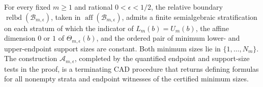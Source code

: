 For every fixed \(m\geq1\) and rational \(0<\epsilon<1/2\), the relative boundary \(\operatorname{relbd}(\mathcal B_{m,\epsilon})\), taken in \(\operatorname{aff}(\mathcal B_{m,\epsilon})\), admits a finite semialgebraic stratification on each stratum of which the indicator of \(L_m(b)=U_m(b)\), the affine dimension \(0\) or \(1\) of \(\Theta_{m,\epsilon}(b)\), and the ordered pair of minimum lower- and upper-endpoint support sizes are constant.  Both minimum sizes lie in \(\{1,\ldots,N_m\}\).  The construction \(\mathcal A_{m,\epsilon}\), completed by the quantified endpoint and support-size tests in the proof, is a terminating CAD procedure that returns defining formulas for all nonempty strata and endpoint witnesses of the certified minimum sizes.